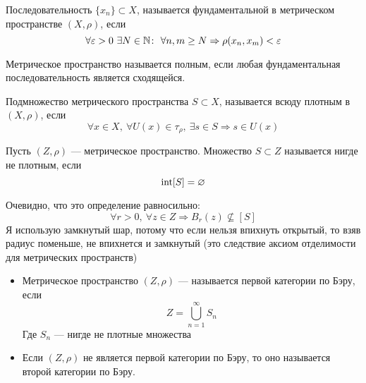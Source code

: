 \begin{definition}
	Последовательность $\{x_n\} \subset X$, называется фундаментальной в метрическом пространстве $(X,\rho)$, если
	$$
	\forall \varepsilon > 0 \ \exists N \in \mathbb{N} \colon \  \forall n, m \geq N \Rightarrow \rho(x_n,x_m) < \varepsilon 
	$$
\end{definition}
\begin{definition}
	Метрическое пространство называется полным, если любая фундаментальная последовательность является сходящейся. 
\end{definition}

\begin{definition}
	Подмножество метрического пространства $S \subset X$, называется всюду плотным в $(X, \rho)$, если 
	$$
	\forall x \in X, \ \forall U(x) \in \tau_\rho, \ \exists s \in S \Rightarrow s \in U(x)
	$$
\end{definition}

\begin{definition}
	Пусть $(Z, \rho)$ --- метрическое пространство. Множество $S \subset Z$ называется нигде не плотным, если 
	$$
	\operatorname{int} [S] = \varnothing
	$$
\end{definition}
\begin{remark}
	Очевидно, что это определение равносильно:
	$$
	\forall r > 0, \ \forall z \in Z \Rightarrow B_r(z) \nsubseteq [S]
	$$
	Я использую замкнутый шар, потому что если нельзя впихнуть открытый, то взяв радиус поменьше, не впихнется и замкнутый (это следствие аксиом отделимости для метрических пространств)
\end{remark}

\begin{definition}
	\hfill 
	\begin{itemize}
		\item Метрическое пространство $(Z, \rho)$ --- называется первой категории по Бэру, если 
		$$
		Z = \bigcup_{n=1}^\infty S_n
		$$
		Где $S_n$ --- нигде не плотные множества
		\item Если $(Z, \rho)$ не является первой категории по Бэру, то оно называется второй категории по Бэру.
	\end{itemize} 
\end{definition}

